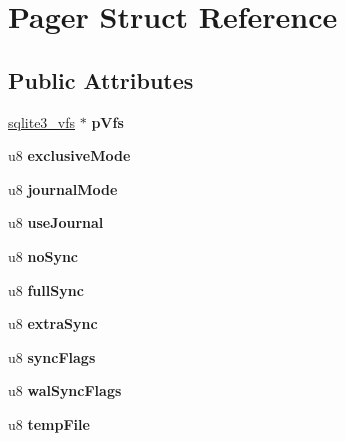 \hypertarget{struct_pager}{}\section{Pager Struct Reference}
\label{struct_pager}
\subsection*{Public Attributes}
\begin{DoxyCompactItemize}
\item 
\mbox{\label{struct_pager_affa78e08a7f691a4c8f7043e0b4c9212}} 
\mbox{\hyperlink{structsqlite3__vfs}{sqlite3\+\_\+vfs}} $\ast$ {\bfseries p\+Vfs}
\item 
\mbox{\label{struct_pager_a5cbccc156e07d6226cb65a7ab05ac116}} 
u8 {\bfseries exclusive\+Mode}
\item 
\mbox{\label{struct_pager_a9ad7bd09f1c9323d943ee17ddf42e46e}} 
u8 {\bfseries journal\+Mode}
\item 
\mbox{\label{struct_pager_af7783f866150d7e322c28cb324ad85d6}} 
u8 {\bfseries use\+Journal}
\item 
\mbox{\label{struct_pager_ae943093a3ccbfbf264ccf3c8a52edac1}} 
u8 {\bfseries no\+Sync}
\item 
\mbox{\label{struct_pager_abae5c9c3d85120ae266acc4c9a355b86}} 
u8 {\bfseries full\+Sync}
\item 
\mbox{\label{struct_pager_a942f1ff74fbe690c2777d181c791589f}} 
u8 {\bfseries extra\+Sync}
\item 
\mbox{\label{struct_pager_ac7f90d27da63090369a0e44a0bceb525}} 
u8 {\bfseries sync\+Flags}
\item 
\mbox{\label{struct_pager_aa8c8c2d893e4d2165f089ddde3e85103}} 
u8 {\bfseries wal\+Sync\+Flags}
\item 
\mbox{\label{struct_pager_a9caa1abb43f6e839dd9a265c27b0b9e4}} 
u8 {\bfseries temp\+File}
\item 

\end{DoxyCompactItemize}
